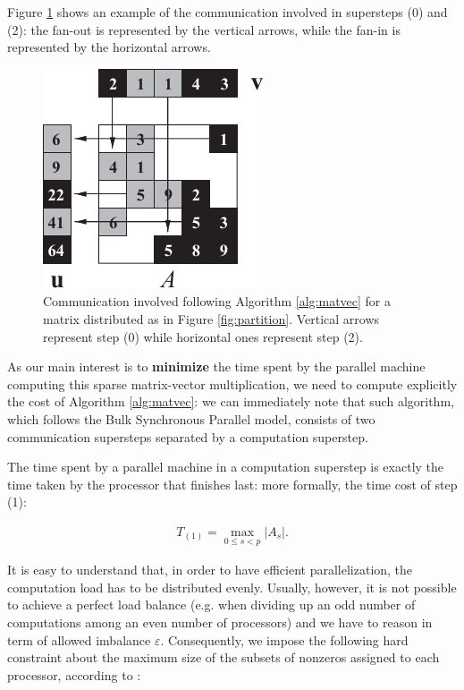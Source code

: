 Figure \ref{fig:communication} shows an example of the communication involved in supersteps (0) and (2): the fan-out is represented by the vertical arrows, while the fan-in is represented by the horizontal arrows. 


\begin{figure}[h]
	\centering
	\includegraphics{img/communication}
	\caption{Communication involved following Algorithm \ref{alg:matvec} for a matrix distributed as in Figure \ref{fig:partition}. Vertical arrows represent step (0) while horizontal ones represent step (2).}
	\label{fig:communication}
\end{figure}



As our main interest is to \textbf{minimize} the time spent by the parallel machine computing this sparse matrix-vector multiplication, we need to compute explicitly the cost of Algorithm \ref{alg:matvec}: we can immediately note that such algorithm, which follows the Bulk Synchronous Parallel model\cite{bsp_paper}, consists of two communication supersteps separated by a computation superstep.

The time spent by a parallel machine in a computation superstep is exactly the time taken by the processor that finishes last: more formally, the time cost of step (1):

\begin{align}
	T_{(1)} = \max_{0 \leq s < p } |A_s|.
	\label{eq:T_comp}
\end{align}

It is easy to understand that, in order to have efficient parallelization, the computation load has to be distributed evenly. Usually, however, it is not possible to achieve a perfect load balance (e.g. when dividing up an odd number of computations among an even number of processors) and we have to reason in term of allowed imbalance $\varepsilon$. Consequently, we impose the following hard constraint about the maximum size of the subsets of nonzeros assigned to each processor, according to \cite[eq.~4.27]{BSP}:

